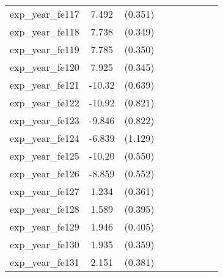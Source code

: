 {\begin{tabular}{l*{4}{cc}}
exp\_year\_fe117&    7.492\sym{***}&  (0.351)&                  &         &                  &         &                  &         \\
exp\_year\_fe118&    7.738\sym{***}&  (0.349)&                  &         &                  &         &                  &         \\
exp\_year\_fe119&    7.785\sym{***}&  (0.350)&                  &         &                  &         &                  &         \\
exp\_year\_fe120&    7.925\sym{***}&  (0.345)&                  &         &                  &         &                  &         \\
exp\_year\_fe121&   -10.32\sym{***}&  (0.639)&                  &         &                  &         &                  &         \\
exp\_year\_fe122&   -10.92\sym{***}&  (0.821)&                  &         &                  &         &                  &         \\
exp\_year\_fe123&   -9.846\sym{***}&  (0.822)&                  &         &                  &         &                  &         \\
exp\_year\_fe124&   -6.839\sym{***}&  (1.129)&                  &         &                  &         &                  &         \\
exp\_year\_fe125&   -10.20\sym{***}&  (0.550)&                  &         &                  &         &                  &         \\
exp\_year\_fe126&   -8.859\sym{***}&  (0.552)&                  &         &                  &         &                  &         \\
exp\_year\_fe127&    1.234\sym{***}&  (0.361)&                  &         &                  &         &                  &         \\
exp\_year\_fe128&    1.589\sym{***}&  (0.395)&                  &         &                  &         &                  &         \\
exp\_year\_fe129&    1.946\sym{***}&  (0.405)&                  &         &                  &         &                  &         \\
exp\_year\_fe130&    1.935\sym{***}&  (0.359)&                  &         &                  &         &                  &         \\
exp\_year\_fe131&    2.151\sym{***}&  (0.381)&                  &         &                  &         &                  &         \\

\end{tabular}}
